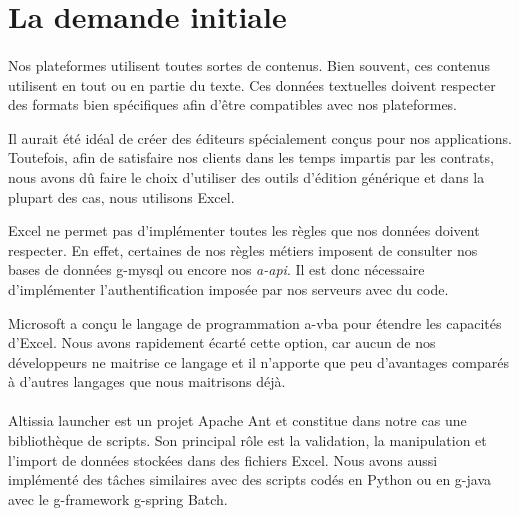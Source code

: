 \section{La demande initiale}
\label{sec:initial-request}

\paragraph{}
Nos plateformes utilisent toutes sortes de contenus.
Bien souvent, ces contenus utilisent en tout ou en partie du texte.
Ces données textuelles doivent respecter des formats bien spécifiques afin d'être compatibles avec nos plateformes.

Il aurait été idéal de créer des éditeurs spécialement conçus pour nos applications.
Toutefois, afin de satisfaire nos clients dans les temps impartis par les contrats, nous avons dû faire le choix d'utiliser des outils d'édition générique et dans la plupart des cas, nous utilisons Excel.

Excel ne permet pas d'implémenter toutes les règles que nos données doivent respecter.
En effet, certaines de nos règles métiers imposent de consulter nos bases de données \gls{g-mysql} ou encore nos \textit{\gls{a-api}}.
Il est donc nécessaire d'implémenter l'authentification imposée par nos serveurs avec du code.

Microsoft a conçu le langage de programmation \gls{a-vba} pour étendre les capacités d'Excel\cite{o365devx_pris_nodate}.
Nous avons rapidement écarté cette option, car aucun de nos développeurs ne maitrise ce langage et il n'apporte que peu d'avantages comparés à d'autres langages que nous maitrisons déjà.

\paragraph{}
Altissia launcher est un projet Apache Ant\fnmark{} et constitue dans notre cas une bibliothèque de scripts.
Son principal rôle est la validation, la manipulation et l'import de données stockées dans des fichiers Excel.
Nous avons aussi implémenté des tâches similaires avec des scripts codés en Python\fnmark{} ou en \gls{g-java} avec le \gls{g-framework} \Gls{g-spring} Batch\fnmark{}.

